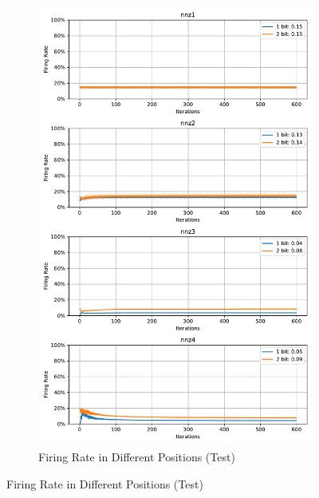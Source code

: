         \begin{figure}[H]
            \centering
            \ContinuedFloat
            \begin{subfigure}[H]{\textwidth}
                \centering
                \includegraphics[width=\textwidth]{../firerate/DVSGesture/plots/dvsgesture_test_firerate.pdf}
                \caption{Firing Rate in Different Positions (Test)}
            \end{subfigure}
        \end{figure}
